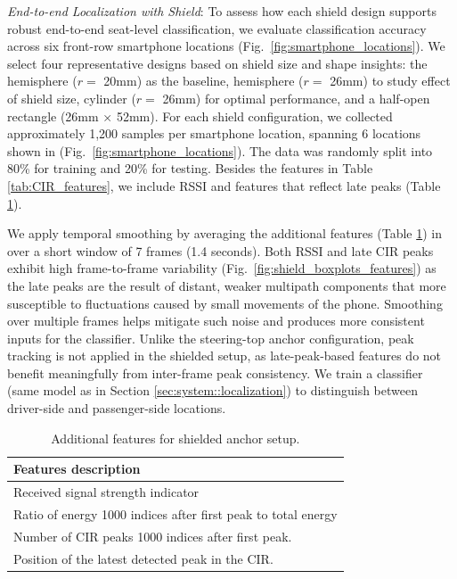\documentclass[sigconf]{acmart}
\newcommand{\vp}{\vspace{-1.5em}}
\begin{document}
\textit{End-to-end Localization with Shield}:
To assess how each shield design supports robust end-to-end seat-level 
classification, we evaluate classification accuracy across six front-row 
smartphone locations (Fig.~\ref{fig:smartphone_locations}). 
%
We select four representative designs based on shield size and shape 
insights: the hemisphere ($r=$ 20mm) as the baseline, hemisphere
($r=$ 26mm) to study effect of shield size, cylinder ($r=$ 26mm) for optimal 
performance, and a half-open rectangle (26mm × 52mm).
%
For each shield configuration, we collected approximately 1,200 samples per smartphone location, spanning 6 locations shown 
in (Fig.~\ref{fig:smartphone_locations}). The data was randomly split 
into 80\% for training and 20\% for testing. Besides the features
in Table \ref{tab:CIR_features}, we include RSSI and features that reflect late peaks (Table \ref{tab:Shield_features}).

We apply temporal smoothing by averaging the additional features (Table \ref{tab:Shield_features}) in over a short window 
of 7 frames (1.4 seconds). Both RSSI and late CIR peaks exhibit high 
frame-to-frame variability (Fig.~\ref{fig:shield_boxplots_features}) as the late 
peaks are the result of distant, weaker multipath components that more susceptible 
to fluctuations caused by small movements of the phone. Smoothing over multiple 
frames helps mitigate such noise and produces more consistent inputs for the 
classifier. Unlike the steering-top anchor configuration, peak tracking is not applied in the shielded setup, as late-peak-based features do not benefit meaningfully from inter-frame peak consistency. We train 
a classifier (same model as in Section \ref{sec:system::localization}) to 
distinguish between driver-side and passenger-side locations. 
\begin{table}[t]
\caption{Additional features for shielded anchor setup.}
\label{tab:Shield_features}
\vp\small
\begin{tabular}{|l|}
\hline
\textbf{Features description }                                      \\ \hline
Received signal strength indicator               \\ \hline
Ratio of energy 1000 indices after first peak to total energy                 \\ \hline
Number of CIR peaks 1000 indices after first peak. \\ \hline
Position of the latest detected peak in the CIR.   \\ \hline
\end{tabular}
\vspace{-2.2em}
\end{table}
\end{document}
